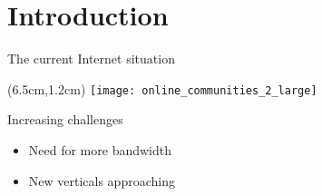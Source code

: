 \section{Introduction}
\begin{frame}{The current Internet situation}
  \begin{textblock*}{5cm}(6.5cm,1.2cm)
    \texttt{[image: online\_communities\_2\_large]}
  \end{textblock*}

  Increasing challenges
  \begin{itemize}
  \item<1-> Need for more bandwidth
  \item<2-> New verticals approaching
  \end{itemize}
\end{frame}
